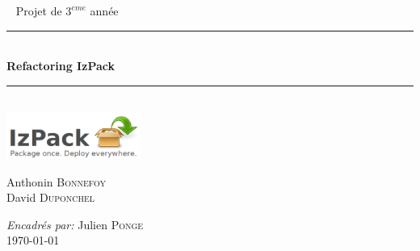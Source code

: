 \begin{frame}[plain]
\begin{center}
~
\vfill
\Large Projet de $3^{eme}$ année\\[1cm]
\hrule
~\\[0.4cm]
{ \Huge \bfseries Refactoring IzPack}\\[0.4cm]
\hrule
~\\[0.4cm]
\includegraphics[height=1.5cm]{../image/izpack-logo-big.png}
\\[0.4cm]
\vfill
\begin{minipage}{0.45\textwidth}
\begin{flushleft} %
\small
Anthonin \textsc{Bonnefoy}\\
David \textsc{Duponchel}\\
\end{flushleft}
\end{minipage}
\begin{minipage}{0.5\textwidth}
\begin{flushright}
\small
\emph{Encadrés par: }Julien \textsc{Ponge}\\
{\today}
\end{flushright}
\end{minipage}\\[1cm]
\end{center}
\end{frame}
